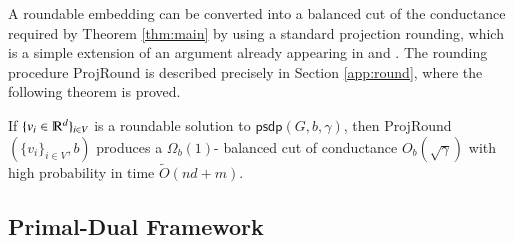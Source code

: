 \documentclass[twoside,leqno,twocolumn]{article}
\renewcommand{\mathbb}{\varmathbb}
\newcommand{\R}{\mathbb R}
\numberwithin{equation}{section}
\newcommand{\psdp}{{\ensuremath{{\mathsf{psdp}}}\xspace}}
\begin{document}
\noindent
A roundable embedding can be converted into a balanced cut of the conductance required by Theorem \ref{thm:main} by using a standard projection rounding, which is a simple extension of an argument already appearing in \cite{ARV} and \cite{AK}. The rounding procedure {\sc ProjRound} is described precisely in Section \ref{app:round}, where the following theorem is proved.
\begin{theorem}\label{thm:stdround}
If $\{v_i \in \R^d \}_{i \in V}$ is a roundable solution to $\psdp(G,b,\gamma)$, then {\sc ProjRound}$(\{v_i\}_{i \in V}, b)$ produces a $\Omega_b(1)$- balanced cut of conductance $O_b\left(\sqrt{\gamma}\right)$ with high probability in time $\tilde{O}(n d + m).$
\end{theorem}

\subsection{Primal-Dual Framework} \label{sec:pd}
\end{document}

